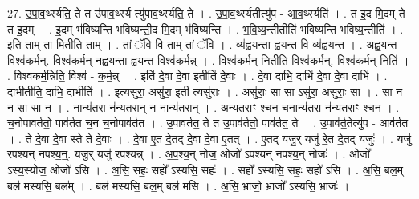 \documentclass[17pt]{extarticle}
\begin{document}
27. उ॒पा॒व॒र्थ्स्यति॒ ते त उ॑पाव॒र्थ्स्य त्यु॑पाव॒र्थ्स्यति॒ ते । . उ॒पा॒व॒र्थ्स्यतीत्यु॑प - आ॒व॒र्थ्स्यति॑ । . त इ॒द मि॒दम् ते त इ॒दम् । . इ॒दम् भ॑विष्यन्ति भविष्यन्ती॒द मि॒दम् भ॑विष्यन्ति । . भ॒वि॒ष्य॒न्तीतीति॑ भविष्यन्ति भविष्य॒न्तीति॑ । . इति॒ ताम् ता मितीति॒ ताम् । . तां ॅवि वि ताम् तां ॅवि । . व्य॑ह्वयन्ता ह्वयन्त॒ वि व्य॑ह्वयन्त । . अ॒ह्व॒य॒न्त॒ विश्व॑कर्म॒न्॒. विश्व॑कर्मन् नह्वयन्ता ह्वयन्त॒ विश्व॑कर्मन्न् । . विश्व॑कर्म॒न् नितीति॒ विश्व॑कर्म॒न्॒. विश्व॑कर्म॒न् निति॑ । . विश्व॑कर्म॒न्निति॒ विश्व॑ - क॒र्म॒न्न् । . इति॑ दे॒वा दे॒वा इतीति॑ दे॒वाः । . दे॒वा दाभि॒ दाभि॑ दे॒वा दे॒वा दाभि॑ । . दाभीतीति॒ दाभि॒ दाभीति॑ । . इत्यसु॑रा॒ असु॑रा॒ इती त्यसु॑राः । . असु॑राः॒ सा सा ऽसु॑रा॒ असु॑राः॒ सा । . सा न न सा सा न । . नान्य॑त॒रा न॑न्यत॒रान् न नान्य॑त॒रान् । . अ॒न्य॒त॒राꣳ श्च॒न च॒नान्य॑त॒रा न॑न्यत॒राꣳ श्च॒न । . च॒नोपाव॑र्ततो॒ पाव॑र्तत च॒न च॒नोपाव॑र्तत । . उ॒पाव॑र्तत॒ ते त उ॒पाव॑र्ततो॒ पाव॑र्तत॒ ते । . उ॒पाव॑र्त॒तेत्यु॑प - आव॑र्तत । . ते दे॒वा दे॒वा स्ते ते दे॒वाः । . दे॒वा ए॒त दे॒तद् दे॒वा दे॒वा ए॒तत् । . ए॒तद् यजु॒र् यजु॑ रे॒त दे॒तद् यजुः॑ । . यजु॑ रपश्यन् नपश्य॒न्॒. यजु॒र् यजु॑ रपश्यन्न् । . अ॒प॒श्य॒न् नोज॒ ओजो॑ ऽपश्यन् नपश्य॒न् नोजः॑ । . ओजो᳚ ऽस्य॒स्योज॒ ओजो॑ ऽसि । . अ॒सि॒ सहः॒ सहो᳚ ऽस्यसि॒ सहः॑ । . सहो᳚ ऽस्यसि॒ सहः॒ सहो॑ ऽसि । . अ॒सि॒ बल॒म् बल॑ मस्यसि॒ बल᳚म् । . बल॑ मस्यसि॒ बल॒म् बल॑ मसि । . अ॒सि॒ भ्राजो॒ भ्राजो᳚ ऽस्यसि॒ भ्राजः॑ । \newline
\end{document}
